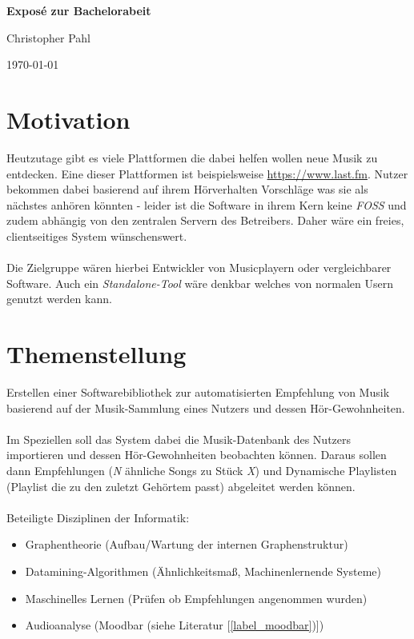 \documentclass[8pt,a4paper,ngerman]{scrartcl}
\begin{document}
\begin{center}
    \LARGE{\textbf{Exposé zur Bachelorabeit}}
\end{center}
\begin{center}
    \large{Christopher Pahl}
\end{center}
\begin{center}
    \small{\today}
\end{center}

\section{Motivation}
    Heutzutage gibt es viele Plattformen die dabei helfen wollen neue Musik zu
    entdecken. Eine dieser Plattformen ist beispielsweise
    \url{https://www.last.fm}. Nutzer bekommen dabei
    basierend auf ihrem Hörverhalten Vorschläge was sie als nächstes anhören
    könnten - leider ist die Software in ihrem Kern keine \emph{FOSS} und zudem
    abhängig von den zentralen Servern des Betreibers. Daher wäre ein freies,
    clientseitiges System wünschenswert.
    \\
    \\
    Die Zielgruppe wären hierbei Entwickler von Musicplayern oder vergleichbarer
    Software. Auch ein \emph{Standalone-Tool} wäre denkbar welches von normalen Usern
    genutzt werden kann.

\section{Themenstellung}
    Erstellen einer Softwarebibliothek zur automatisierten Empfehlung von Musik
    basierend auf der Musik-Sammlung eines Nutzers und dessen Hör-Gewohnheiten.
    \\
    \\
    Im Speziellen soll das System dabei die Musik-Datenbank des Nutzers importieren
    und dessen Hör-Gewohnheiten beobachten können. Daraus sollen dann
    Empfehlungen (\textit{N} ähnliche Songs zu Stück \textit{X}) und Dynamische Playlisten 
    (Playlist die zu den zuletzt Gehörtem passt) abgeleitet werden können.
    \\
    \\
    Beteiligte Disziplinen der Informatik:

    \begin{itemize}
        \item Graphentheorie (Aufbau/Wartung der internen Graphenstruktur)
        \item Datamining-Algorithmen (Ähnlichkeitsmaß, Machinenlernende Systeme)
        \item Maschinelles Lernen (Prüfen ob Empfehlungen angenommen wurden)
        \item Audioanalyse (Moodbar (siehe Literatur [\ref{label_moodbar})])
    \end{itemize}
\end{document}
